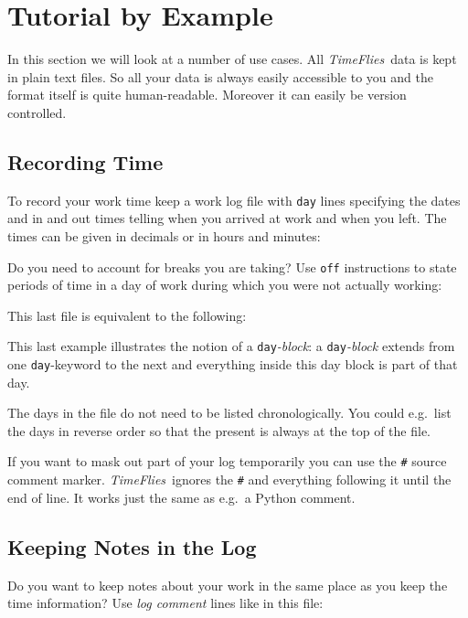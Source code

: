 \documentclass[11pt]{article}
\newcommand{\timeflies}{\emph{TimeFlies}}
\begin{document}
\section{Tutorial by Example}

In this section we will look at a number of use cases. All \timeflies\ data is kept in plain text files. So all your data is always easily accessible to you and the format itself is quite human-readable. Moreover it can easily be version controlled.

\subsection{Recording Time}

To record your work time keep a work log file with \verb-day- lines specifying the dates and in and out times telling when you arrived at work and when you left. The times can be given in decimals or in hours and minutes:



Do you need to account for breaks you are taking? Use \verb-off- instructions to state periods of time in a day of work during which you were not actually working:



This last file is equivalent to the following:



This last example illustrates the notion of a \verb-day-\emph{-block}: a \verb-day-\emph{-block} extends
from one \verb-day--keyword to the next and everything inside this day block is part of that day.

The days in the file do not need to be listed chronologically. You could e.g.\ list the days in reverse order so that the present is always at the top of the file.

If you want to mask out part of your log temporarily you can use the \verb-#- source comment marker. \timeflies\ ignores the \verb-#- and everything following it until the end of line. It works just the same as e.g.\ a Python comment.



\subsection{Keeping Notes in the Log}

Do you want to keep notes about your work in the same place as you keep the time information? Use \emph{log comment} lines like in this file:
\end{document}
